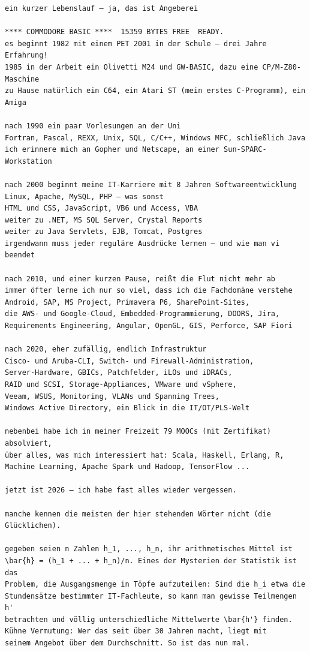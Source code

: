 \documentclass[11pt,a4paper]{article}
\begin{document}
\begin{Verbatim}[fontsize=\small]
ein kurzer Lebenslauf – ja, das ist Angeberei

**** COMMODORE BASIC ****  15359 BYTES FREE  READY.
es beginnt 1982 mit einem PET 2001 in der Schule – drei Jahre Erfahrung!
1985 in der Arbeit ein Olivetti M24 und GW-BASIC, dazu eine CP/M-Z80-Maschine
zu Hause natürlich ein C64, ein Atari ST (mein erstes C-Programm), ein Amiga

nach 1990 ein paar Vorlesungen an der Uni
Fortran, Pascal, REXX, Unix, SQL, C/C++, Windows MFC, schließlich Java
ich erinnere mich an Gopher und Netscape, an einer Sun-SPARC-Workstation

nach 2000 beginnt meine IT-Karriere mit 8 Jahren Softwareentwicklung
Linux, Apache, MySQL, PHP – was sonst
HTML und CSS, JavaScript, VB6 und Access, VBA
weiter zu .NET, MS SQL Server, Crystal Reports
weiter zu Java Servlets, EJB, Tomcat, Postgres
irgendwann muss jeder reguläre Ausdrücke lernen – und wie man vi beendet

nach 2010, und einer kurzen Pause, reißt die Flut nicht mehr ab
immer öfter lerne ich nur so viel, dass ich die Fachdomäne verstehe
Android, SAP, MS Project, Primavera P6, SharePoint-Sites,
die AWS- und Google-Cloud, Embedded-Programmierung, DOORS, Jira,
Requirements Engineering, Angular, OpenGL, GIS, Perforce, SAP Fiori

nach 2020, eher zufällig, endlich Infrastruktur
Cisco- und Aruba-CLI, Switch- und Firewall-Administration,
Server-Hardware, GBICs, Patchfelder, iLOs und iDRACs,
RAID und SCSI, Storage-Appliances, VMware und vSphere,
Veeam, WSUS, Monitoring, VLANs und Spanning Trees,
Windows Active Directory, ein Blick in die IT/OT/PLS-Welt

nebenbei habe ich in meiner Freizeit 79 MOOCs (mit Zertifikat) absolviert,
über alles, was mich interessiert hat: Scala, Haskell, Erlang, R,
Machine Learning, Apache Spark und Hadoop, TensorFlow ...

jetzt ist 2026 – ich habe fast alles wieder vergessen.

manche kennen die meisten der hier stehenden Wörter nicht (die Glücklichen).

gegeben seien n Zahlen h_1, ..., h_n, ihr arithmetisches Mittel ist
\bar{h} = (h_1 + ... + h_n)/n. Eines der Mysterien der Statistik ist das
Problem, die Ausgangsmenge in Töpfe aufzuteilen: Sind die h_i etwa die
Stundensätze bestimmter IT-Fachleute, so kann man gewisse Teilmengen h'
betrachten und völlig unterschiedliche Mittelwerte \bar{h'} finden.
Kühne Vermutung: Wer das seit über 30 Jahren macht, liegt mit
seinem Angebot über dem Durchschnitt. So ist das nun mal.
\end{Verbatim}
\end{document}
